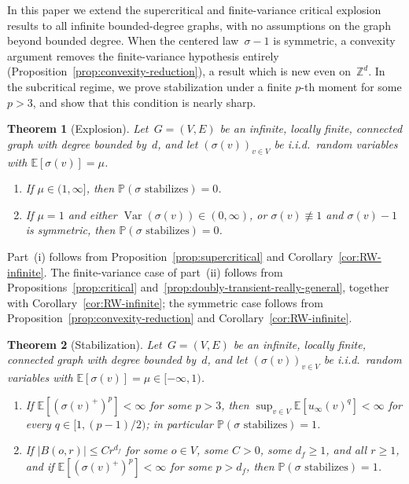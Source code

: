 \documentclass[11pt]{amsart}
\theoremstyle{plain}
\newtheorem{theorem}{Theorem}[section]
\theoremstyle{definition}
\newcommand{\Z}{\mathbb{Z}}
\newcommand{\E}{\mathbb{E}}
\renewcommand{\P}{\mathbb{P}}
\DeclareMathOperator{\var}{Var}
\begin{document}
	In this paper we extend the supercritical and finite-variance critical explosion results to all infinite bounded-degree graphs, with no assumptions on the graph beyond bounded degree. When the centered law~$\sigma-1$ is symmetric, a convexity argument removes the finite-variance hypothesis entirely (Proposition~\ref{prop:convexity-reduction}), a result which is new even on~$\Z^d$. In the subcritical regime, we prove stabilization under a finite $p$-th moment for some $p > 3$, and show that this condition is nearly sharp.
	
	\begin{theorem}[Explosion]\label{thm:explosion}
		Let~$G = (V,E)$ be an infinite, locally finite, connected graph with
		degree bounded by~$d$, and let $(\sigma(v))_{v\in V}$ be i.i.d.\ random variables
		with $\E[\sigma(v)] = \mu$.
		\begin{enumerate}[label=\textup{(\roman*)}]
			\item If $\mu \in (1,\infty]$, then
			$\P(\sigma \text{ stabilizes}) = 0$.
			\item If $\mu = 1$ and either $\var(\sigma(v))\in(0,\infty)$, or $\sigma(v)\not\equiv 1$ and $\sigma(v)-1$ is symmetric, then
			$\P(\sigma \text{ stabilizes}) = 0$.
		\end{enumerate}
	\end{theorem}
	
	Part~(i) follows from Proposition~\ref{prop:supercritical} and Corollary~\ref{cor:RW-infinite}. The finite-variance case of part~(ii) follows from Propositions~\ref{prop:critical} and~\ref{prop:doubly-transient-really-general}, together with Corollary~\ref{cor:RW-infinite}; the symmetric case follows from Proposition~\ref{prop:convexity-reduction} and Corollary~\ref{cor:RW-infinite}.
	
	\begin{theorem}[Stabilization]\label{thm:stab}
		Let~$G = (V,E)$ be an infinite, locally finite, connected graph with
		degree bounded by~$d$, and let $(\sigma(v))_{v\in V}$ be i.i.d.\ random variables
		with $\E[\sigma(v)] = \mu \in [-\infty,1)$.
		\begin{enumerate}[label=\textup{(\roman*)}]
			\item If $\E[(\sigma(v)^+)^p] < \infty$ for some $p > 3$, then
			$\sup_{v \in V}\E[u_\infty(v)^q] < \infty$ for every $q\in[1,(p-1)/2)$; in particular $\P(\sigma \text{ stabilizes}) = 1$.
			\item If $|B(o,r)|\leq C r^{d_f}$ for some $o\in V$, some $C>0$, some $d_f\geq 1$, and all $r\geq 1$, and if $\E[(\sigma(v)^+)^p] < \infty$ for some $p > d_f$, then $\P(\sigma \text{ stabilizes}) = 1$.
		\end{enumerate}
	\end{theorem}
	
\end{document}
